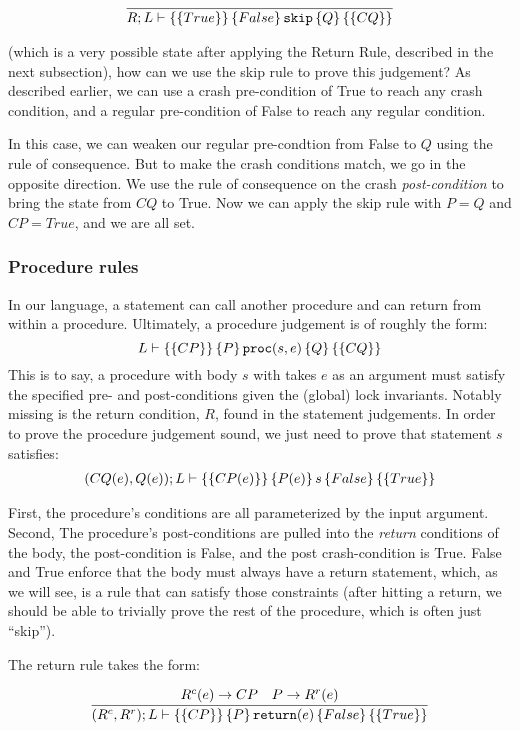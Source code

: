 \begin{gather*}
\infer{\hoarestmt{R}{L}{True}{False}{\texttt{skip}}{Q}{CQ}}{}
\end{gather*}

(which is a very possible state after applying the Return Rule, described in the
next subsection), how can we use the skip rule to prove this judgement? As
described earlier, we can use a crash pre-condition of True to reach any crash
condition, and a regular pre-condition of False to reach any regular condition.

In this case, we can weaken our regular pre-condtion from False to $Q$
using the rule of consequence. But to make the crash conditions match, we go in
the opposite direction. We use the rule of consequence on the crash
\textit{post-condition} to bring the state from $CQ$ to True. Now we can apply
the skip rule with $P=Q$ and $CP=True$, and we are all set.

\subsubsection{Procedure rules}

In our language, a statement can call another procedure and can return from
within a procedure. Ultimately, a procedure judgement is of roughly the form:
$$L \vdash \left\{\left\{ CP \right\}\right\} \left\{ P \right\} \texttt{proc}(s, e) \left\{ Q \right\} \left\{\left\{ CQ \right\}\right\}$$
This is to say, a procedure with body $s$ with takes $e$ as an argument must
satisfy the specified pre- and post-conditions given the (global) lock
invariants. Notably missing is the return condition, $R$, found in the statement
judgements. In order to prove the procedure judgement sound, we just need to
prove that statement $s$ satisfies:
\begin{gather*}
(CQ(e),Q(e)); L \vdash \left\{\left\{ CP(e) \right\}\right\} \left\{ P(e) \right\} s \left\{ False \right\} \left\{\left\{ True \right\}\right\}
\end{gather*}

First, the procedure's conditions are all parameterized by the input argument.
Second, The procedure's post-conditions are pulled into the \textit{return}
conditions of the body, the post-condition is False, and the post
crash-condition is True. False and True enforce that the body must always have a
return statement, which, as we will see, is a rule that can satisfy those
constraints (after hitting a return, we should be able to trivially prove the
rest of the procedure, which is often just ``skip'').

The return rule takes the form:

\begin{gather*}
    \infer{\hoarestmt{(R^c,R^r)}{L}{CP}{P}{\texttt{return}(e)}{False}{True}}
	  {R^c(e) \imp CP & P \imp R^r(e)}
\end{gather*}

